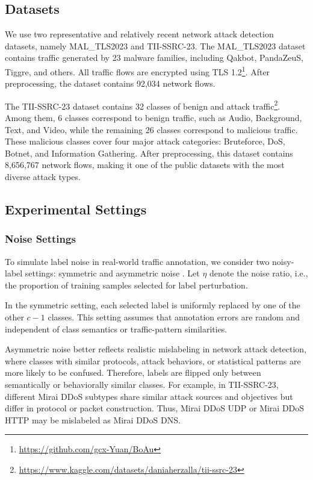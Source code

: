 \documentclass{SCIS2026}
\begin{document}
\subsection{Datasets}

We use two representative and relatively recent network attack detection datasets, namely MAL\_TLS2023 and TII-SSRC-23. The MAL\_TLS2023 dataset contains traffic generated by 23 malware families, including Qakbot, PandaZeuS, Tiggre, and others. All traffic flows are encrypted using TLS 1.2\footnote{\url{https://github.com/gcx-Yuan/BoAu}}. After preprocessing, the dataset contains 92,034 network flows.

The TII-SSRC-23 dataset contains 32 classes of benign and attack traffic\footnote{\url{https://www.kaggle.com/datasets/daniaherzalla/tii-ssrc-23}}. Among them, 6 classes correspond to benign traffic, such as Audio, Background, Text, and Video, while the remaining 26 classes correspond to malicious traffic. These malicious classes cover four major attack categories: Bruteforce, DoS, Botnet, and Information Gathering. After preprocessing, this dataset contains 8,656,767 network flows, making it one of the public datasets with the most diverse attack types.

\subsection{Experimental Settings}

\subsubsection{Noise Settings}


To simulate label noise in real-world traffic annotation, we consider two noisy-label settings: symmetric and asymmetric noise \cite{CoLD}. Let $\eta$ denote the noise ratio, i.e., the proportion of training samples selected for label perturbation.

In the symmetric setting, each selected label is uniformly replaced by one of the other $c-1$ classes. This setting assumes that annotation errors are random and independent of class semantics or traffic-pattern similarities.

Asymmetric noise better reflects realistic mislabeling in network attack detection, where classes with similar protocols, attack behaviors, or statistical patterns are more likely to be confused. Therefore, labels are flipped only between semantically or behaviorally similar classes. For example, in TII-SSRC-23, different Mirai DDoS subtypes share similar attack sources and objectives but differ in protocol or packet construction. Thus, Mirai DDoS UDP or Mirai DDoS HTTP may be mislabeled as Mirai DDoS DNS.
\end{document}
